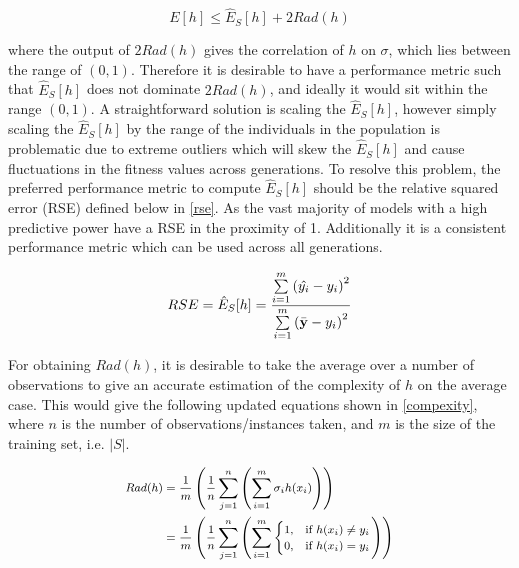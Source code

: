 \documentclass[conference]{IEEEtran}
\begin{document}
\begin{equation}\label{fitness_new}
E[h]\leq \hat{E}_{S}[h] + 2Rad(h)
\end{equation}

\bigbreak
\noindent
where the output of $2Rad(h)$ gives the correlation of $h$ on $\sigma$, which lies between the range of $(0, 1)$. Therefore it is desirable to have a performance metric such that $\hat{E}_{S}[h]$ does not dominate $2Rad(h)$, and ideally it would sit within the range $(0, 1)$. A straightforward solution is scaling the $\hat{E}_{S}[h]$, however simply scaling the $\hat{E}_{S}[h]$ by the range of the individuals in the population is problematic due to extreme outliers which will skew the $\hat{E}_{S}[h]$ and cause fluctuations in the fitness values across generations. To resolve this problem, the preferred performance metric to compute $\hat{E}_{S}[h]$ should be the relative squared error (RSE) defined below in \eqref{rse}. As the vast majority of models with a high predictive power have a RSE in the proximity of 1. Additionally it is a consistent performance metric which can be used across all generations.

\begin{equation}\label{rse}
\footnotesize
RSE = \hat{E}_{S}[h] = \frac{\sum\limits_{i=1}^m\left(\hat{y_{i}} - y_{i}\right)^2}{\sum\limits_{i=1}^m\left(\bar{\mathbf{y}} - y_{i}\right)^2}
\end{equation}

\bigbreak
For obtaining $Rad(h)$, it is desirable to take the average over a number of observations to give an accurate estimation of the complexity of $h$ on the average case. This would give the following updated equations shown in \eqref{compexity}, where $n$ is the number of observations/instances taken, and $m$ is the size of the training set, i.e. $|S|$.

\begin{equation}\label{compexity}
\footnotesize
\begin{aligned}
Rad(h) & =  \frac{1}{m}\left(\frac{1}{n}\sum\limits_{j=1}^n\left(\sum\limits_{i=1}^m \sigma_{i}h(x_{i})\right)\right)\\
&= \frac{1}{m}\left(\frac{1}{n}\sum\limits_{j=1}^n\left(\sum\limits_{i=1}^m \begin{cases}
    1, & \text{if $h(x_{i}) \neq y_{i}$}\\
    0, & \text{if $h(x_{i}) = y_{i}$}
	\end{cases}\right)\right)\\
\end{aligned}
\end{equation}
\end{document}
